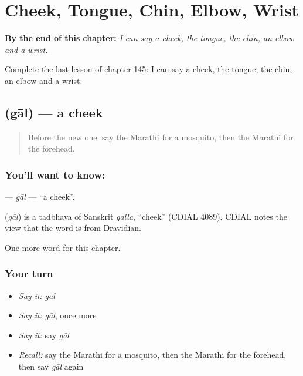 
\chapter{Cheek, Tongue, Chin, Elbow, Wrist}
\label{ch:mr-cheek-tongue-chin-elbow-wrist}

\begin{chapteropening}
\textbf{By the end of this chapter:} \emph{I can say a cheek, the tongue, the chin, an elbow and a wrist.}

Complete the last lesson of chapter 145: I can say a cheek, the tongue, the chin, an elbow and a wrist.
\end{chapteropening}

\section[\texorpdfstring{\mr{गाल} (gāl)}{गाल (gāl)}]{ (gāl) — a cheek}

\label{lesson:MR-C145-gal}



\begin{quote}
Before the new one: say the Marathi for a mosquito, then the Marathi for the forehead.
\end{quote}

\subsection*{You'll want to know: }
\textbf{} — \emph{gāl} — \textquotedblleft{}a cheek\textquotedblright{}.

\begin{cousinweb}
\textbf{} (\emph{gāl}) is a tadbhava of Sanskrit \emph{galla}, \textquotedblleft{}cheek\textquotedblright{} (CDIAL 4089). CDIAL notes the view that the word is from Dravidian.
\end{cousinweb}

\begin{grammarlens}[title={What you've built}]
One more word for this chapter.
\end{grammarlens}

\subsection*{Your turn}
\begin{itemize}
\raggedright
  \item \emph{Say it:} \emph{gāl}
  \item \emph{Say it:} \emph{gāl}, once more
  \item \emph{Say it:} say \emph{gāl}
  \item \emph{Recall:} say the Marathi for a mosquito, then the Marathi for the forehead, then say \emph{gāl} again
\end{itemize}


